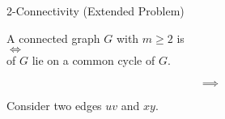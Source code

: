 \begin{frame}{}
  \begin{exampleblock}{2-Connectivity (Extended Problem)}
    \begin{center}
      A connected graph $G$ with $m \ge 2$ is  \\[3pt]
      $\iff$ \\[3pt]
       of $G$ lie on a common cycle of $G$.
    \end{center}
  \end{exampleblock}

  \pause
  \[
    \implies
  \]
  \begin{center}
    Consider two edges $uv$ and $xy$.
  \end{center}

  \pause
  \begin{columns}
  \end{columns}
\end{frame}
